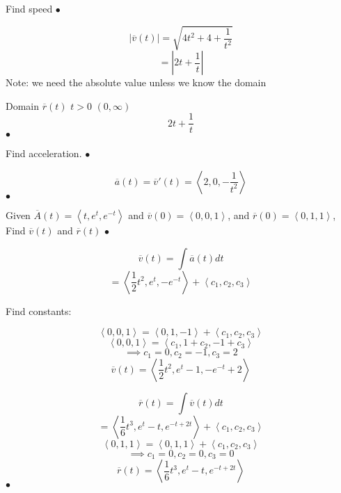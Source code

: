 \begin{example}[speed]
	Find speed
\smallskip\hfill$\bullet$\end{example}

\begin{solution}[speed]

	\[\left| \overline{v}(t) \right| = \sqrt{4t^2 + 4 +\frac{1}{t^2}} \]
	\[= \left| 2t + \frac{1}{t} \right| \]
	Note: we need the absolute value unless we know the domain

	Domain $\overline{r}(t)$ $t>0$ $(0,\infty)$
	\[\boxed{2t + \frac{1}{t}}\]
\smallskip\hfill$\bullet$\end{solution}

\begin{example}[acceleration]
	Find acceleration.
\smallskip\hfill$\bullet$\end{example}

\begin{solution}[acceleration]
	\[\overline{a}(t) = \overline{v}'(t) = \left< 2, 0, -\frac{1}{t^2} \right>\]
\smallskip\hfill$\bullet$\end{solution}

\begin{example}
	Given $\overline{A}(t) = \left<t, e^{t}, e^{-t} \right>$ and $\overline{v}(0) = \left<0, 0, 1 \right>$, and
	$\overline{r}(0) = \left< 0, 1, 1 \right>$, Find $\overline{v}(t)$ and $\overline{r}(t)$
\smallskip\hfill$\bullet$\end{example}

\begin{solution}
	\[\overline{v}(t) = \int \overline{a}(t) dt\]
	\[= \left< \frac{1}{2}t^2, e^{t},-e^{-t} \right> + \left< c_1, c_2, c_3 \right>\]

	Find constants:

	\[\left<0, 0, 1 \right> = \left<0, 1, -1 \right> + \left<c_1, c_2, c_3 \right>\]
	\[\left<0, 0, 1 \right> =\left<c_1, 1+c_2, -1 +c_3 \right>\]
	\[\implies c_1=0, c_2=-1, c_3=2\]
	\[\overline{v}(t) = \boxed{\left<\frac{1}{2}t^2, e^{t}-1, -e^{-t}+2 \right> }\]

	\[\overline{r}(t) = \int \overline{v}(t) dt\]
	\[=\left<\frac{1}{6}t^{3}, e^{t} - t, e^{-t + 2t} \right>+ \left<c_1,c_2,c_3 \right>\]
	\[\left<0,1,1 \right> = \left<0, 1, 1 \right> + \left< c_1, c_2,c_3 \right>\]
	\[\implies c_1=0,c_2=0, c_3=0\]
	\[\overline{r}(t) = \boxed{\left<\frac{1}{6}t^{3}, e^{t} - t, e^{-t + 2t} \right> }\]
\smallskip\hfill$\bullet$\end{solution}


